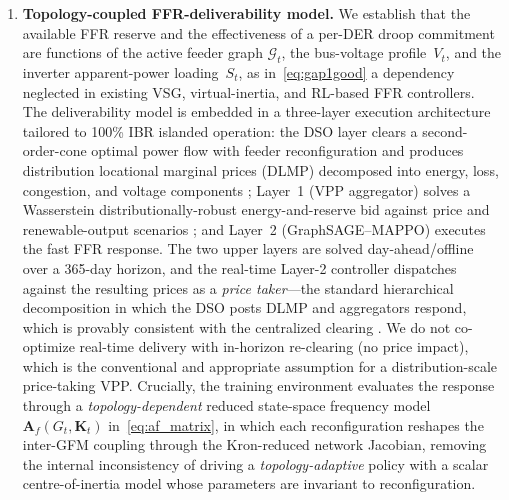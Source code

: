 \documentclass[lettersize,journal]{IEEEtran}
\begin{document}
\begin{enumerate}[leftmargin=*]

  \item \textbf{Topology-coupled FFR-deliverability model.}
        We establish that the available FFR reserve and the effectiveness of a per-DER droop commitment are functions of the active feeder graph $\mathcal{G}_t$, the bus-voltage profile~$V_t$, and the inverter apparent-power loading~$S_t$, as in~\eqref{eq:gap1good} a dependency neglected in existing VSG, virtual-inertia, and RL-based FFR controllers. The deliverability model is embedded in a three-layer execution architecture tailored to 100\% IBR islanded operation: the DSO layer clears a second-order-cone optimal power flow with feeder reconfiguration and produces distribution locational marginal prices (DLMP) decomposed into energy, loss, congestion, and voltage components \cite{bai2018dlmp,basdomenech2024dlmp}; Layer~1 (VPP aggregator) solves a Wasserstein distributionally-robust energy-and-reserve bid against price and renewable-output scenarios \cite{liu2021wdrovpp,arrigo2021wdroreserve}; and Layer~2 (GraphSAGE--MAPPO) executes the fast FFR response. The two upper layers are solved day-ahead/offline over a 365-day horizon, and the real-time Layer-2 controller dispatches against the resulting prices as a \emph{price taker}---the standard hierarchical decomposition in which the DSO posts DLMP and aggregators respond, which is provably consistent with the centralized clearing \cite{huang2015dlmp,li2014dlmp,rahimiyan2016pricetaker}. We do not co-optimize real-time delivery with in-horizon re-clearing (no price impact), which is the conventional and appropriate assumption for a distribution-scale price-taking VPP. Crucially, the training environment evaluates the response through a \emph{topology-dependent} reduced state-space frequency model $\mathbf{A}_f(G_t,\mathbf{K}_t)$ in~\eqref{eq:af_matrix}, in which each reconfiguration
        reshapes the inter-GFM coupling through the Kron-reduced network Jacobian, removing the internal inconsistency of driving a \emph{topology-adaptive} policy with a scalar centre-of-inertia model whose parameters are invariant to reconfiguration.


\end{enumerate}
\end{document}
